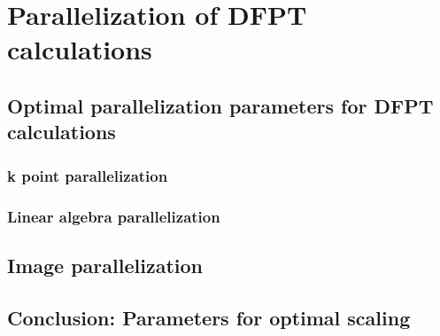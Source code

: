 \documentclass[main.tex]{subfiles}
\begin{document}
\chapter{Parallelization of DFPT calculations}

\section{Optimal parallelization parameters for DFPT calculations}

\subsection{k point parallelization}

\subsection{Linear algebra parallelization}

\section{Image parallelization}

\section{Conclusion: Parameters for optimal scaling}
\end{document}
